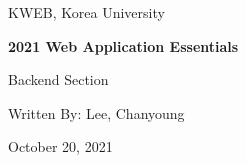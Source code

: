 \begin{titlepage}
    \centering
    \vspace*{35mm}
    \par\vspace{5mm}
    {\large KWEB, Korea University}
    \par\vspace{20mm}
    {\large\bfseries 2021 Web Application Essentials \par\huge Backend Section}
    \par\vspace{30mm}
    {\large Written By: Lee, Chanyoung}
    \par\vspace{30mm}
    {\large October 20, 2021}
\end{titlepage}

